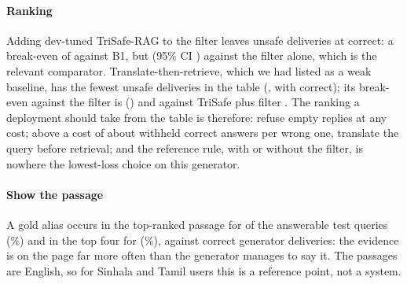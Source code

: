 \paragraph{Ranking} Adding dev-tuned TriSafe-RAG to the filter leaves \LTemptyUnsafe{} unsafe deliveries at \LTemptyCorrect{} correct: a break-even of \LTemptyBreakEven{} against B1, but \LTemptyBreakEvenEmpty{} (95\% CI \LTemptyBreakEvenEmptyCI) against the filter alone, which is the relevant comparator. Translate-then-retrieve, which we had listed as a weak baseline, has the fewest unsafe deliveries in the table (\LEsixUnsafe, with \LEsixCorrect{} correct); its break-even against the filter is \LEsixBreakEvenEmpty{} (\LEsixBreakEvenEmptyCI) and against TriSafe plus filter \LCrossEsixTempty. The ranking a deployment should take from the table is therefore: refuse empty replies at any cost; above a cost of about \LEsixBreakEvenEmpty{} withheld correct answers per wrong one, translate the query before retrieval; and the reference rule, with or without the filter, is nowhere the lowest-loss choice on this generator.

\paragraph{Show the passage} A gold alias occurs in the top-ranked passage for \LShowTopone{} of the \LShowN{} answerable test queries (\LShowToponePct\%) and in the top four for \LShowTopk{} (\LShowTopkPct\%), against \LBoneCorrect{} correct generator deliveries: the evidence is on the page far more often than the generator manages to say it. The passages are English, so for Sinhala and Tamil users this is a reference point, not a system.

